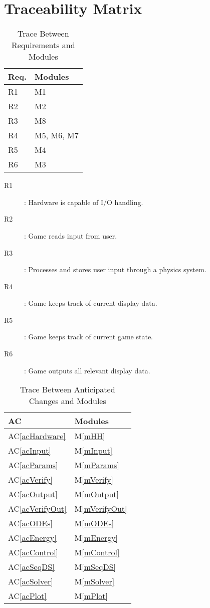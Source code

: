 \documentclass[12pt, titlepage]{article}
\newcommand{\acref}[1]{AC\ref{#1}}
\newcommand{\mref}[1]{M\ref{#1}}
\begin{document}
\section{Traceability Matrix} \label{SecTM}
\begin{table}[H]
\centering
\begin{tabular}{p{} p{}}
\toprule
\textbf{Req.} & \textbf{Modules}\\
\midrule
R1 & M1\\
R2 & M2\\
R3 & M8\\
R4 & M5, M6, M7\\
R5 & M4\\
R6 & M3\\
\bottomrule
\end{tabular}
\caption{Trace Between Requirements and Modules}
\begin{description}
\item[R1]: Hardware is capable of I/O handling. 
\item[R2]: Game reads input from user.
\item[R3]: Processes and stores user input through a physics system.
\item[R4]: Game keeps track of current display data.
\item[R5]: Game keeps track of current game state.
\item[R6]: Game outputs all relevant display data.
\end{description}

\label{TblRT}
\end{table}
\begin{table}[H]
\centering
\begin{tabular}{p{} p{}}
\toprule
\textbf{AC} & \textbf{Modules}\\
\midrule
\acref{acHardware} & \mref{mHH}\\
\acref{acInput} & \mref{mInput}\\
\acref{acParams} & \mref{mParams}\\
\acref{acVerify} & \mref{mVerify}\\
\acref{acOutput} & \mref{mOutput}\\
\acref{acVerifyOut} & \mref{mVerifyOut}\\
\acref{acODEs} & \mref{mODEs}\\
\acref{acEnergy} & \mref{mEnergy}\\
\acref{acControl} & \mref{mControl}\\
\acref{acSeqDS} & \mref{mSeqDS}\\
\acref{acSolver} & \mref{mSolver}\\
\acref{acPlot} & \mref{mPlot}\\
\bottomrule
\end{tabular}
\caption{Trace Between Anticipated Changes and Modules}
\label{TblACT}
\end{table}
\end{document}
